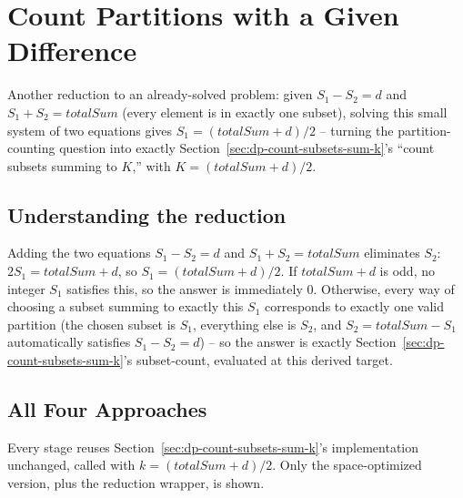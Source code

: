 \section{Count Partitions with a Given Difference}
\label{sec:dp-count-partitions-diff}


\begin{patternbox}
Another reduction to an already-solved problem: given
$S_1 - S_2 = d$ and $S_1 + S_2 = \textit{totalSum}$ (every element is in
exactly one subset), solving this small system of two equations gives
$S_1 = (\textit{totalSum}+d)/2$ -- turning the partition-counting
question into exactly Section~\ref{sec:dp-count-subsets-sum-k}'s
``count subsets summing to $K$,'' with $K = (\textit{totalSum}+d)/2$.
\end{patternbox}

\subsection*{Understanding the reduction}

Adding the two equations $S_1-S_2=d$ and $S_1+S_2=\textit{totalSum}$
eliminates $S_2$: $2S_1 = \textit{totalSum}+d$, so $S_1 =
(\textit{totalSum}+d)/2$. If $\textit{totalSum}+d$ is odd, no integer
$S_1$ satisfies this, so the answer is immediately $0$. Otherwise, every
way of choosing a subset summing to exactly this $S_1$ corresponds to
exactly one valid partition (the chosen subset is $S_1$, everything else
is $S_2$, and $S_2 = \textit{totalSum}-S_1$ automatically satisfies
$S_1-S_2=d$) -- so the answer is exactly
Section~\ref{sec:dp-count-subsets-sum-k}'s subset-count, evaluated at
this derived target.

\subsection*{All Four Approaches}

Every stage reuses Section~\ref{sec:dp-count-subsets-sum-k}'s
implementation unchanged, called with $k = (\textit{totalSum}+d)/2$.
Only the space-optimized version, plus the reduction wrapper, is shown.

